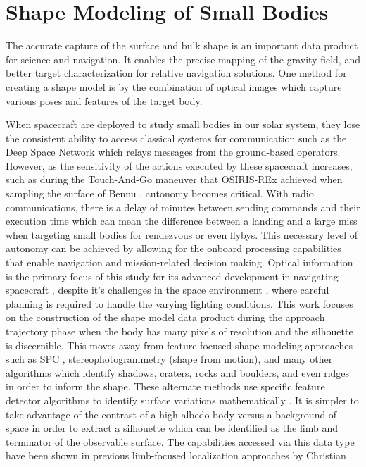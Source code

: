 \section{Shape Modeling of Small Bodies}
The accurate capture of the surface and bulk shape is an important data product for science and navigation. It enables the precise mapping of the gravity field, and better target characterization for relative navigation solutions. One method for creating a shape model is by the combination of optical images which capture various poses and features of the target body. 


When spacecraft are deployed to study small bodies in our solar system, they lose the consistent ability to access classical systems for communication such as the Deep Space Network which relays messages from the ground-based operators. However, as the sensitivity of the actions executed by these spacecraft increases, such as during the Touch-And-Go maneuver that OSIRIS-REx achieved when sampling the surface of Bennu \citep{Berry2013}, autonomy becomes critical. With radio communications, there is a delay of minutes between sending commands and their execution time which can mean the difference between a landing and a large miss when targeting small bodies for rendezvous or even flybys. This necessary level of autonomy can be achieved by allowing for the onboard processing capabilities that enable navigation and mission-related decision making. Optical information is the primary focus of this study for its advanced development in navigating spacecraft \citep{Owen2011}, despite it's challenges in the space environment \citep{DellaGiustina2018}, where careful planning is required to handle the varying lighting conditions. This work focuses on the construction of the shape model data product during the approach trajectory phase when the body has many pixels of resolution and the silhouette is discernible. This moves away from feature-focused shape modeling approaches such as SPC \citep{Gaskell2008}, stereophotogrammetry (shape from motion)\citep{Hartley2000}, and many other algorithms which identify shadows, craters, rocks and boulders, and even ridges in order to inform the shape. These alternate methods use specific feature detector algorithms to identify surface variations mathematically \citep{Lowe2004}. It is simpler to take advantage of the contrast of a high-albedo body versus a background of space in order to extract a silhouette which can be identified as the limb and terminator of the observable surface. The capabilities accessed via this data type have been shown in previous limb-focused localization approaches by Christian \citep{Christian2017}. 

